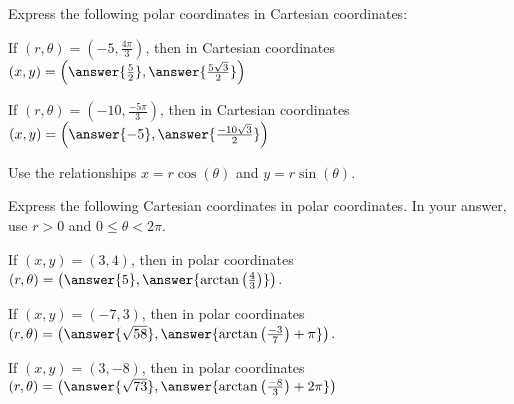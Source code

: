 \documentclass{ximera}
\author{Jason Miller}
\begin{document}
\begin{exercise}

Express the following polar coordinates in Cartesian coordinates: 

If $\left(r,\theta\right) =\left( -5, \frac{4\pi}{3} \right)$, then in Cartesian coordinates $(x,y) = \left( \answer{ \frac{5}{2}}, \answer{\frac{5\sqrt{3}}{2}} \right)$

If $\left(r,\theta\right) =\left( -10, \frac{-5\pi}{3} \right)$, then in Cartesian coordinates $(x,y) = \left( \answer{ -5 },  \answer{ \frac{-10 \sqrt{3}}{2} }     \right)$

\begin{hint}
Use the relationships $x=r\cos(\theta)$ and $y=r\sin(\theta)$.
\end{hint}

\end{exercise}

\begin{exercise}

Express the following Cartesian coordinates in polar coordinates.  In your answer, use $r>0$ and $0 \leq \theta < 2\pi$. 


If $(x,y) =\left( 3, 4 \right)$, then in polar coordinates $(r,\theta) =\left( \answer{ 5}, \answer{  \arctan\left( \frac{4}{3}\right) } \right) $. 

If $(x,y) =\left(-7, 3 \right)$, then in polar coordinates $(r,\theta) =\left( \answer{ \sqrt{58} } , \answer{  \arctan\left( \frac{-3}{7} \right) + \pi    } \right)$. 

If $(x,y) =\left(  3  ,  -8   \right)$, then in polar coordinates $(r,\theta) =\left (  \answer{ \sqrt{73}  }, \answer{\arctan\left( \frac{-8}{3}\right) + 2\pi } \right)$




\end{exercise}
\end{document}
